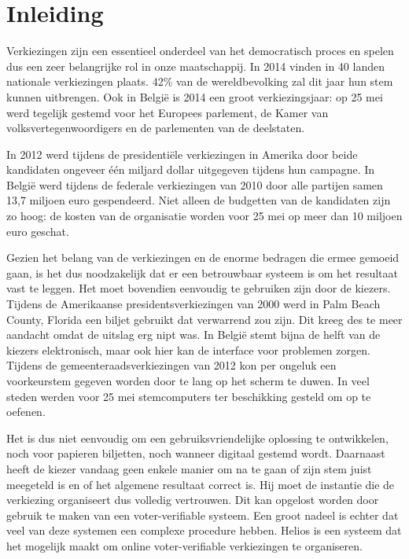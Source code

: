 % 
%

\chapter{Inleiding}
\label{chap:inleiding}

Verkiezingen zijn een essentieel onderdeel van het democratisch proces en spelen dus een zeer belangrijke rol in onze maatschappij. In 2014 vinden in 40 landen nationale verkiezingen plaats. 42\% van de wereldbevolking zal dit jaar hun stem kunnen uitbrengen.\cite{news:economist_2014_ballot_boxes} Ook in Belgi\"e is 2014 een groot verkiezingsjaar: op 25 mei werd tegelijk gestemd voor het Europees parlement, de Kamer van volksvertegenwoordigers en de parlementen van de deelstaten.

\npar In 2012 werd tijdens de presidenti\"ele verkiezingen in Amerika door beide kandidaten ongeveer \'e\'en miljard dollar uitgegeven tijdens hun campagne.\cite{news:nytimes_2012_money_race} In Belgi\"e werd tijdens de federale verkiezingen van 2010 door alle partijen samen 13,7 miljoen euro gespendeerd. Niet alleen de budgetten van de kandidaten zijn zo hoog: de kosten van de organisatie worden voor 25 mei op meer dan 10 miljoen euro geschat.\cite{news:tijd_moeder_aller_verkiezingen_kostprijs}

\npar Gezien het belang van de verkiezingen en de enorme bedragen die ermee gemoeid gaan, is het dus noodzakelijk dat er een betrouwbaar systeem is om het resultaat vast te leggen. Het moet bovendien eenvoudig te gebruiken zijn door de kiezers. Tijdens de Amerikaanse presidentsverkiezingen van 2000 werd in Palm Beach County, Florida een biljet gebruikt dat verwarrend zou zijn. Dit kreeg des te meer aandacht omdat de uitslag erg nipt was.\cite{wiki:united_states_presidential_election_in_florida_2000} In Belgi\"e stemt bijna de helft van de kiezers elektronisch, maar ook hier kan de interface voor problemen zorgen. Tijdens de gemeenteraadsverkiezingen van 2012 kon per ongeluk een voorkeurstem gegeven worden door te lang op het scherm te duwen.\cite{news:maddens_zijn_de_stemcomputers_wel_te_vertrouwen} In veel steden werden voor 25 mei stemcomputers ter beschikking gesteld om op te oefenen.\cite{news:de_redactie_ga_eens_oefenen_op_een_stemcomputer}

\npar Het is dus niet eenvoudig om een gebruiksvriendelijke oplossing te ontwikkelen, noch voor papieren biljetten, noch wanneer digitaal gestemd wordt. Daarnaast heeft de kiezer vandaag geen enkele manier om na te gaan of zijn stem juist meegeteld is en of het algemene resultaat correct is. Hij moet de instantie die de verkiezing organiseert dus volledig vertrouwen. Dit kan opgelost worden door gebruik te maken van een voter-verifiable systeem. Een groot nadeel is echter dat veel van deze systemen een complexe procedure hebben. Helios is een systeem dat het mogelijk maakt om online voter-verifiable verkiezingen te organiseren.

